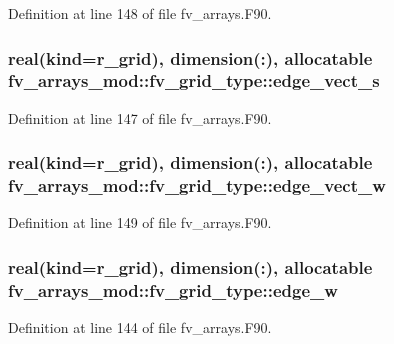 Definition at line 148 of file fv\-\_\-arrays.\-F90.

\subsubsection[{edge\-\_\-vect\-\_\-s}]{\setlength{\rightskip}{0pt plus 5cm}real(kind={\bf r\-\_\-grid}), dimension(\-:), allocatable fv\-\_\-arrays\-\_\-mod\-::fv\-\_\-grid\-\_\-type\-::edge\-\_\-vect\-\_\-s}\label{structfv__arrays__mod_1_1fv__grid__type_ad3b04032fd9e8d0706c654c2ca24863c}


Definition at line 147 of file fv\-\_\-arrays.\-F90.

\subsubsection[{edge\-\_\-vect\-\_\-w}]{\setlength{\rightskip}{0pt plus 5cm}real(kind={\bf r\-\_\-grid}), dimension(\-:), allocatable fv\-\_\-arrays\-\_\-mod\-::fv\-\_\-grid\-\_\-type\-::edge\-\_\-vect\-\_\-w}\label{structfv__arrays__mod_1_1fv__grid__type_a97c23e80372b2ccd08f13a1c6c114e11}


Definition at line 149 of file fv\-\_\-arrays.\-F90.

\subsubsection[{edge\-\_\-w}]{\setlength{\rightskip}{0pt plus 5cm}real(kind={\bf r\-\_\-grid}), dimension(\-:), allocatable fv\-\_\-arrays\-\_\-mod\-::fv\-\_\-grid\-\_\-type\-::edge\-\_\-w}\label{structfv__arrays__mod_1_1fv__grid__type_ab6786382391fee454bca4507790d6df9}


Definition at line 144 of file fv\-\_\-arrays.\-F90.

